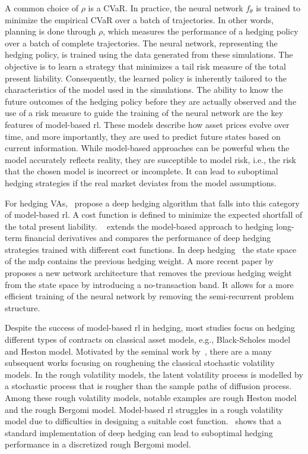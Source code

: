 A common choice of $\rho$ is a CVaR.
In practice, the neural network $f_{\theta}$ is trained to minimize the empirical CVaR over a batch of trajectories.
In other words, planning is done through $\rho$, which measures the performance of a hedging policy over a batch of complete trajectories.
The neural network, representing the hedging policy, is trained using the data generated from these simulations. 
The objective is to learn a strategy that minimizes a tail risk measure of the total present liability.
Consequently, the learned policy is inherently tailored to the characteristics of the model used in the simulations.
The ability to know the future outcomes of the hedging policy before they are actually observed and the use of a risk measure to guide the training of the neural network are the key features of model-based \gls{rl}.
These models describe how asset prices evolve over time, and more importantly, they are used to predict future states based on current information.
While model-based approaches can be powerful when the model accurately reflects reality, they are susceptible to model risk, i.e., the risk that the chosen model is incorrect or incomplete. 
It can lead to suboptimal hedging strategies if the real market deviates from the model assumptions.

For hedging VAs,~\cite{xu2020variable} propose a deep hedging algorithm that falls into this category of model-based \gls{rl}.
A cost function is defined to minimize the expected shortfall of the total present liability.
~\cite{carbonneau2021deep} extends the model-based approach to hedging long-term financial derivatives and compares the performance of deep hedging strategies trained with different cost functions.
In deep hedging~\citep{buehler2019deep} the state space of the \gls{mdp} contains the previous hedging weight.
A more recent paper by~\cite{imaki2021no} proposes a new network architecture that removes the previous hedging weight from the state space by introducing a no-transaction band.
It allows for a more efficient training of the neural network by removing the semi-recurrent problem structure.

Despite the success of model-based \gls{rl} in hedging, most studies focus on hedging different types of contracts on classical asset models, e.g., Black-Scholes model and Heston model.
Motivated by the seminal work by~\cite{gatheral2022volatility}, there are a many subsequent works focusing on roughening the classical stochastic volatility models. 
In the rough volatility models, the latent volatility process is modelled by a stochastic process that is rougher than the sample paths of diffusion process. 
Among these rough volatility models, notable examples are rough Heston model and the rough Bergomi model. 
Model-based \gls{rl} struggles in a rough volatility model due to difficulties in designing a suitable cost function.~\cite{horvath2021deep} shows that a standard implementation of deep hedging can lead to suboptimal hedging performance in a discretized rough Bergomi model. 

